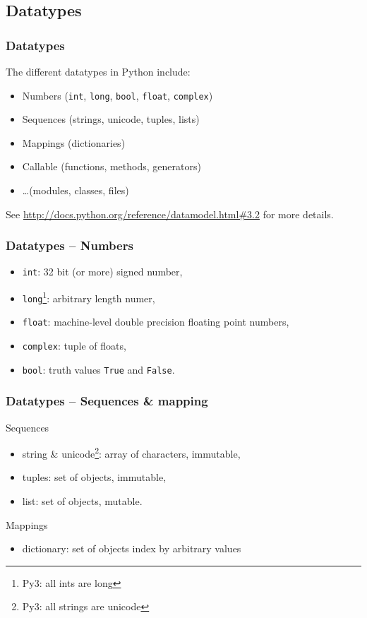 \documentclass[xetex,10pt]{beamer}
\def\spacer{\vspace*{1em}}
\newcommand{\pypypy}[1]{\footnote[frame]{Py3: #1}}
\def\pythoni{\lstinline[language=pythontim]}
\begin{document}
\subsection{Datatypes}

\begin{frame}[fragile]
	\frametitle{Datatypes}
	
	The different datatypes in Python include:
	\spacer
	\begin{itemize}
		\item Numbers (\pythoni{int}, \pythoni{long}, \pythoni{bool}, \pythoni{float}, \pythoni{complex})
		\item Sequences (strings,  unicode, tuples, lists)
		\item Mappings (dictionaries)
		\item Callable (functions, methods, generators)
		\item \ldots (modules, classes, files)
	\end{itemize}
	
	\spacer
	See \url{http://docs.python.org/reference/datamodel.html\#3.2} for more details.
\end{frame}

\begin{frame}[fragile]
	\frametitle{Datatypes -- Numbers}

	\begin{itemize}
		\item \pythoni{int}: 32 bit (or more) signed number,
		\item \pythoni{long}\pypypy{all ints are long}: arbitrary length numer,
		\item \pythoni{float}: machine-level double precision floating point numbers,
		\item \pythoni{complex}: tuple of floats,
		\item \pythoni{bool}: truth values \pythoni{True} and \pythoni{False}.
	\end{itemize}
\end{frame}

\begin{frame}[fragile]
	\frametitle{Datatypes -- Sequences \& mapping}
	
	Sequences
	\begin{itemize}
		\item string \& unicode\pypypy{all strings are unicode}: array of characters, immutable,
		\item tuples: set of objects, immutable,
		\item list: set of objects, mutable.
	\end{itemize}
	\spacer
	Mappings
	\begin{itemize}
		\item dictionary: set of objects index by arbitrary values
	\end{itemize}
\end{frame}
\end{document}

